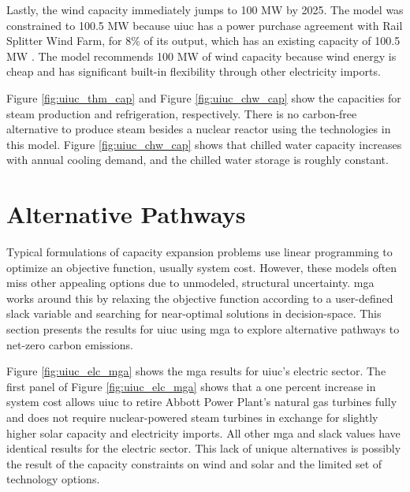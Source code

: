 Lastly, the wind capacity immediately jumps to 100 MW by 2025. The model was
constrained to 100.5 MW because \gls{uiuc} has a power purchase agreement with
Rail Splitter Wind Farm, for 8\% of its output, which has an existing capacity of
100.5 MW  \cite{breitweiser_wind_2016}. The model recommends 100 MW of wind
capacity because wind energy is cheap and has significant built-in flexibility
through other electricity imports.

Figure \ref{fig:uiuc_thm_cap} and Figure \ref{fig:uiuc_chw_cap} show the capacities
for steam production and refrigeration, respectively. There is no carbon-free
alternative to produce steam besides a nuclear reactor using the technologies
in this model. Figure
\ref{fig:uiuc_chw_cap} shows that chilled water capacity increases with annual
cooling demand, and the chilled water storage is roughly constant.


\section{Alternative Pathways}

Typical formulations of capacity expansion problems use linear programming to optimize
an objective function, usually system cost. However, these models often miss
other appealing options due to unmodeled, structural uncertainty. \gls{mga}
works around this by relaxing the objective function according to a user-defined
slack variable and searching for near-optimal solutions in decision-space. This
section presents the results for \gls{uiuc} using \gls{mga} to explore alternative
pathways to net-zero carbon emissions.

Figure \ref{fig:uiuc_elc_mga} shows the \gls{mga} results for \gls{uiuc}'s electric
sector. The first panel of Figure \ref{fig:uiuc_elc_mga} shows that a one percent
increase in system cost allows \gls{uiuc} to retire Abbott Power Plant's
natural gas turbines fully and does not require nuclear-powered steam turbines
in exchange for slightly higher solar capacity and electricity imports. All other
\gls{mga} and slack values have identical results for the electric sector.
This lack of unique alternatives is possibly the result of the capacity constraints on
wind and solar and the limited set of technology options.

